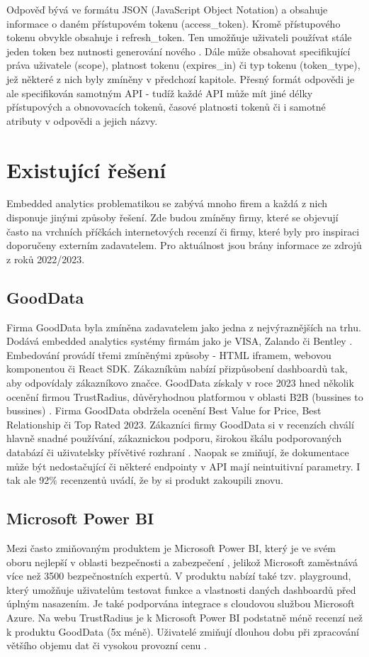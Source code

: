 \documentclass[czech, bc, kiv, he, iso690numb]{fasthesis}
\begin{document}
Odpověď bývá ve formátu JSON (JavaScript Object Notation) a obsahuje informace o daném přístupovém tokenu (access\_token). Kromě přístupového tokenu obvykle obsahuje i refresh\_token. Ten umožňuje uživateli 
používat stále jeden token bez nutnosti generování nového \cite{oauthResponseExample}. Dále může obsahovat specifikující práva uživatele (scope), platnost tokenu (expires\_in) či typ tokenu (token\_type), jež některé z nich byly zmíněny v předchozí kapitole.
Přesný formát odpovědi je ale specifikován samotným API - tudíž každé API může mít jiné délky přístupových a obnovovacích tokenů, časové platnosti tokenů či i samotné atributy v odpovědi a jejich názvy.
%
%
\section{Existující řešení}
Embedded analytics problematikou se zabývá mnoho firem a každá z nich disponuje jinými způsoby řešení. Zde budou zmíněny firmy, které se objevují často na vrchních příčkách
internetových recenzí či firmy, které byly pro inspiraci doporučeny externím zadavatelem. Pro aktuálnost jsou brány informace ze zdrojů z roků 2022/2023.
\subsection{GoodData}
Firma GoodData byla zmíněna zadavatelem jako jedna z nejvýraznějších na trhu. Dodává embedded analytics systémy firmám jako je VISA, Zalando či Bentley \cite{goodDataEmbeddingPlatform}. 
Embedování provádí třemi zmíněnými způsoby - HTML iframem, webovou komponentou či React SDK. Zákazníkům nabízí přizpůsobení dashboardů tak, aby odpovídaly zákazníkovo značce. GoodData získaly
v roce 2023 hned několik ocenění firmou TrustRadius, důvěryhodnou platformou v oblasti B2B (bussines to bussines) \cite{trustRadiusDiscusionGoodData}. Firma GoodData obdržela ocenění Best Value for Price,
Best Relationship či Top Rated 2023. Zákazníci firmy GoodData si v recenzích chválí hlavně snadné používání, zákaznickou podporu, širokou škálu podporovaných databází či uživatelsky přívětivé
rozhraní \cite{trustRadiusDiscusionGoodData}. Naopak se zmiňují, že dokumentace může být nedostačující či některé endpointy v API mají neintuitivní parametry. I tak ale 92\% recenzentů uvádí,
že by si produkt zakoupili znovu.

\subsection{Microsoft Power BI}
Mezi často zmiňovaným produktem je Microsoft Power BI, který je ve svém oboru nejlepší v oblasti bezpečnosti a zabezpečení \cite{bestEmbTools2023},
jelikož Microsoft zaměstnává více než 3500 bezpečnostních expertů. V produktu nabízí také tzv. playground, který
umožňuje uživatelům testovat funkce a vlastnosti daných dashboardů před úplným nasazením. Je také podporvána integrace s cloudovou službou Microsoft Azure. Na webu TrustRadius je k 
Microsoft Power BI podstatně méně recenzí než k produktu GoodData (5x méně). Uživatelé zmiňují dlouhou dobu při zpracování většího objemu dat či vysokou provozní cenu \cite{trustRadiusDiscusionAzure}.
\end{document}
